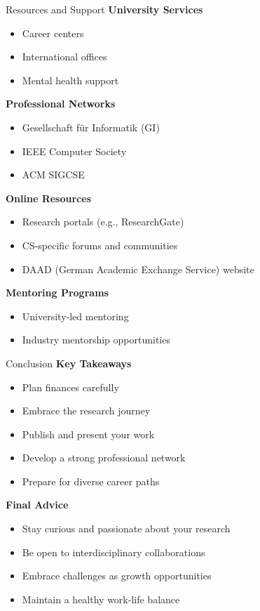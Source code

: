 \documentclass[aspectratio=169,10pt]{beamer}
\begin{document}
\begin{frame}{Resources and Support}
    \textbf{University Services}
    \begin{itemize}
        \item Career centers
        \item International offices
        \item Mental health support
    \end{itemize}
    
    \textbf{Professional Networks}
    \begin{itemize}
        \item Gesellschaft für Informatik (GI)
        \item IEEE Computer Society
        \item ACM SIGCSE
    \end{itemize}
    
    \textbf{Online Resources}
    \begin{itemize}
        \item Research portals (e.g., ResearchGate)
        \item CS-specific forums and communities
        \item DAAD (German Academic Exchange Service) website
    \end{itemize}
    
    \textbf{Mentoring Programs}
    \begin{itemize}
        \item University-led mentoring
        \item Industry mentorship opportunities
    \end{itemize}
\end{frame}

\begin{frame}{Conclusion}
    \textbf{Key Takeaways}
    \begin{itemize}
        \item Plan finances carefully
        \item Embrace the research journey
        \item Publish and present your work
        \item Develop a strong professional network
        \item Prepare for diverse career paths
    \end{itemize}
    
    \textbf{Final Advice}
    \begin{itemize}
        \item Stay curious and passionate about your research
        \item Be open to interdisciplinary collaborations
        \item Embrace challenges as growth opportunities
        \item Maintain a healthy work-life balance
    \end{itemize}
\end{frame}
\end{document}
